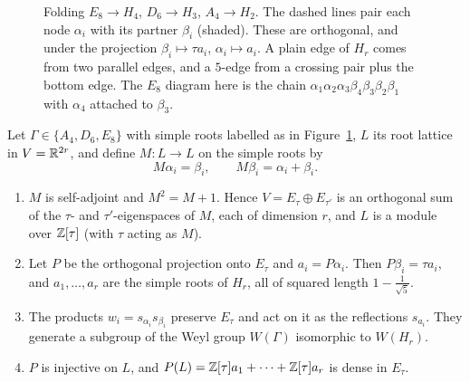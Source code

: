 \begin{figure}[ht]
\caption{Folding $E_8\to H_4$, $D_6\to H_3$, $A_4\to H_2$. The dashed lines pair each node $\alpha_i$
with its partner $\beta_i$ (shaded). These are orthogonal, and under the projection
$\beta_i\mapsto\tau a_i$, $\alpha_i\mapsto a_i$. A plain edge of $H_r$ comes from two parallel edges, and a
$5$-edge from a crossing pair plus the bottom edge. The $E_8$ diagram here is the chain
$\alpha_1\alpha_2\alpha_3\beta_4\beta_3\beta_2\beta_1$ with $\alpha_4$ attached to $\beta_3$.}
\label{ERG:fig:fold}
\end{figure}

\begin{theorem}[Folding]\label{ERG:thm:fold}
Let $\Gamma\in\{A_4,D_6,E_8\}$ with simple roots labelled as in Figure~\ref{ERG:fig:fold}, $L$ its root
lattice in $V=\mathbb{R}^{2r}$, and define $M\colon L\to L$ on the simple roots by
\[
  M\alpha_i=\beta_i,\qquad M\beta_i=\alpha_i+\beta_i .
\]
\begin{enumerate}[nosep]
\item $M$ is self-adjoint and $M^2=M+1$. Hence $V=E_\tau\oplus E_{\tau'}$ is an orthogonal sum of the
  $\tau$- and $\tau'$-eigenspaces of $M$, each of dimension $r$, and $L$ is a module over
  $\mathbb{Z}[\tau]$ (with $\tau$ acting as $M$).
\item Let $P$ be the orthogonal projection onto $E_\tau$ and $a_i=P\alpha_i$. Then $P\beta_i=\tau a_i$, and
  $a_1,\dots,a_r$ are the simple roots of $H_r$, all of squared length $1-\frac1{\sqrt5}$.
\item The products $w_i=s_{\alpha_i}s_{\beta_i}$ preserve $E_\tau$ and act on it as the reflections
  $s_{a_i}$. They generate a subgroup of the Weyl group $W(\Gamma)$ isomorphic to $W(H_r)$.
\item $P$ is injective on $L$, and $P(L)=\mathbb{Z}[\tau]a_1+\dots+\mathbb{Z}[\tau]a_r$ is dense in $E_\tau$.
\end{enumerate}
\end{theorem}

